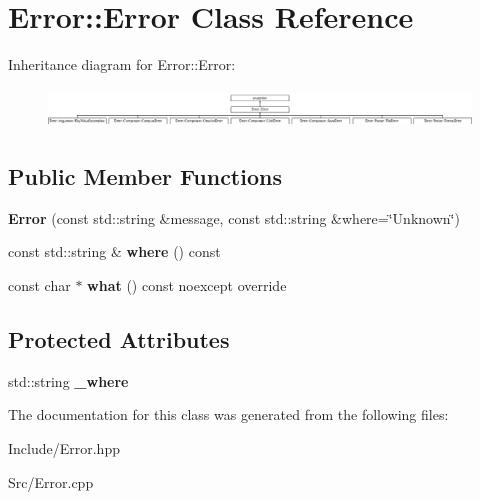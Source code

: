 \hypertarget{classError_1_1Error}{}\section{Error\+:\+:Error Class Reference}
\label{classError_1_1Error}
Inheritance diagram for Error\+:\+:Error\+:\begin{figure}[H]
\begin{center}
\leavevmode
\includegraphics[height=1.038961cm]{classError_1_1Error}
\end{center}
\end{figure}
\subsection*{Public Member Functions}
\begin{DoxyCompactItemize}
\item 
\mbox{\label{classError_1_1Error_a58b5a784c9b6ffd414ef23dfccdfd69d}} 
{\bfseries Error} (const std\+::string \&message, const std\+::string \&where=\char`\"{}Unknown\char`\"{})
\item 
\mbox{\label{classError_1_1Error_ac760553ea2ad58d079155097a2853ac0}} 
const std\+::string \& {\bfseries where} () const
\item 
\mbox{\label{classError_1_1Error_aa9c29452b1555ad2c74c0aacb7cfef63}} 
const char $\ast$ {\bfseries what} () const noexcept override
\end{DoxyCompactItemize}
\subsection*{Protected Attributes}
\begin{DoxyCompactItemize}
\item 
\mbox{\label{classError_1_1Error_ade9c29db1fe508eccb653635ef058e68}} 
std\+::string {\bfseries \+\_\+where}
\end{DoxyCompactItemize}


The documentation for this class was generated from the following files\+:\begin{DoxyCompactItemize}
\item 
Include/Error.\+hpp\item 
Src/Error.\+cpp\end{DoxyCompactItemize}

